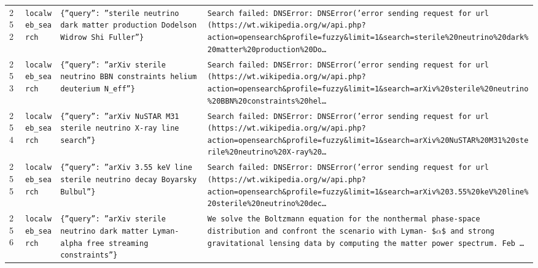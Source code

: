 \documentclass[11pt,a4paper]{article}
\begin{document}
\begin{longtable}{@{}p{}p{}p{}p{}@{}}
252 & \texttt{local}\newline\texttt{web\_\allowbreak{}search} & \texttt{\{''query'':\allowbreak{} ''sterile neutrino dark matter production Dodelson Widrow Shi Fuller''\}\allowbreak{}} & \texttt{Search failed:\allowbreak{} DNSError:\allowbreak{} DNSError('error sending request for url (https:\allowbreak{}/\allowbreak{}/\allowbreak{}wt.wikipedia.org/\allowbreak{}w/\allowbreak{}api.php?action=\allowbreak{}opensearch\&profile=\allowbreak{}fuzzy\&limit=\allowbreak{}1\&search=\allowbreak{}sterile\%20neutrino\%20dark\%20matter\%20production\%20Do\ldots{}\allowbreak{}} \\
253 & \texttt{local}\newline\texttt{web\_\allowbreak{}search} & \texttt{\{''query'':\allowbreak{} ''arXiv sterile neutrino BBN constraints helium deuterium N\_\allowbreak{}eff''\}\allowbreak{}} & \texttt{Search failed:\allowbreak{} DNSError:\allowbreak{} DNSError('error sending request for url (https:\allowbreak{}/\allowbreak{}/\allowbreak{}wt.wikipedia.org/\allowbreak{}w/\allowbreak{}api.php?action=\allowbreak{}opensearch\&profile=\allowbreak{}fuzzy\&limit=\allowbreak{}1\&search=\allowbreak{}arXiv\%20sterile\%20neutrino\%20BBN\%20constraints\%20hel\ldots{}\allowbreak{}} \\
254 & \texttt{local}\newline\texttt{web\_\allowbreak{}search} & \texttt{\{''query'':\allowbreak{} ''arXiv NuSTAR M31 sterile neutrino X-ray line search''\}\allowbreak{}} & \texttt{Search failed:\allowbreak{} DNSError:\allowbreak{} DNSError('error sending request for url (https:\allowbreak{}/\allowbreak{}/\allowbreak{}wt.wikipedia.org/\allowbreak{}w/\allowbreak{}api.php?action=\allowbreak{}opensearch\&profile=\allowbreak{}fuzzy\&limit=\allowbreak{}1\&search=\allowbreak{}arXiv\%20NuSTAR\%20M31\%20sterile\%20neutrino\%20X-ray\%20\ldots{}\allowbreak{}} \\
255 & \texttt{local}\newline\texttt{web\_\allowbreak{}search} & \texttt{\{''query'':\allowbreak{} ''arXiv 3.55 keV line sterile neutrino decay Boyarsky Bulbul''\}\allowbreak{}} & \texttt{Search failed:\allowbreak{} DNSError:\allowbreak{} DNSError('error sending request for url (https:\allowbreak{}/\allowbreak{}/\allowbreak{}wt.wikipedia.org/\allowbreak{}w/\allowbreak{}api.php?action=\allowbreak{}opensearch\&profile=\allowbreak{}fuzzy\&limit=\allowbreak{}1\&search=\allowbreak{}arXiv\%203.55\%20keV\%20line\%20sterile\%20neutrino\%20dec\ldots{}\allowbreak{}} \\
256 & \texttt{local}\newline\texttt{web\_\allowbreak{}search} & \texttt{\{''query'':\allowbreak{} ''arXiv sterile neutrino dark matter Lyman-alpha free streaming constraints''\}\allowbreak{}} & \texttt{We solve the Boltzmann equation for the nonthermal phase-space distribution and confront the scenario with Lyman- \$$\alpha$\$ and strong gravitational lensing data by computing the matter power spectrum. Feb \ldots{}\allowbreak{}} \\

\end{longtable}
\end{document}
